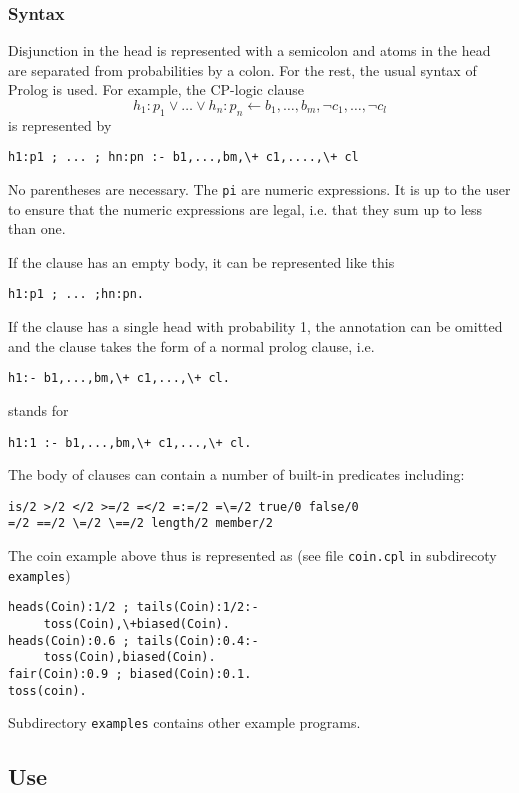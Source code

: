 \subsubsection{Syntax}

Disjunction in the head is represented with a semicolon and atoms in the head are separated from probabilities by a colon. For the rest, the usual syntax of Prolog is used.
For example, the  CP-logic clause
$$h_1:p_1\vee \ldots \vee h_n:p_n\leftarrow b_1,\dots,b_m ,\neg c_1,\ldots,\neg c_l$$
is represented by
\begin{verbatim}
h1:p1 ; ... ; hn:pn :- b1,...,bm,\+ c1,....,\+ cl
\end{verbatim}
 No parentheses are necessary. The \texttt{pi} are numeric expressions. It is up to the user to ensure that the numeric expressions are legal, i.e. that they sum up to less than one.

If the clause has an empty body, it can be represented like this
\begin{verbatim}
h1:p1 ; ... ;hn:pn.
\end{verbatim}
If the clause has a single head with probability 1, the annotation can be omitted and the clause takes the form of a normal prolog clause, i.e. 
\begin{verbatim}
h1:- b1,...,bm,\+ c1,...,\+ cl.
\end{verbatim}
stands for 
\begin{verbatim}
h1:1 :- b1,...,bm,\+ c1,...,\+ cl.
\end{verbatim}



The body of clauses can contain a number of built-in predicates including:
\begin{verbatim}
is/2 >/2 </2 >=/2 =</2 =:=/2 =\=/2 true/0 false/0
=/2 ==/2 \=/2 \==/2 length/2 member/2
\end{verbatim}
The coin example above thus is represented as (see file \texttt{coin.cpl} in subdirecoty \texttt{examples})
\begin{verbatim}
heads(Coin):1/2 ; tails(Coin):1/2:- 
     toss(Coin),\+biased(Coin).
heads(Coin):0.6 ; tails(Coin):0.4:- 
     toss(Coin),biased(Coin).
fair(Coin):0.9 ; biased(Coin):0.1.
toss(coin).
\end{verbatim}

Subdirectory \texttt{examples} contains other example programs.

\subsection{Use}

